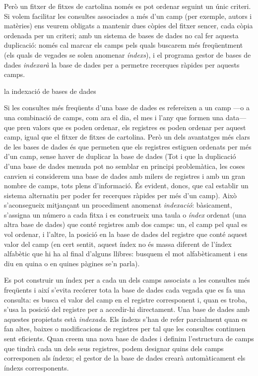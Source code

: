 Però un fitxer de fitxes de cartolina només es pot ordenar seguint un
únic criteri. Si volem facilitar les consultes associades a més d'un
camp (per exemple, autors i matèries) ens veurem obligats a mantenir
dues còpies del fitxer sencer, cada còpia ordenada per un criteri; amb
un sistema de bases de dades no cal fer aquesta duplicació: només cal
marcar els camps pels quals buscarem més freqüentment (els quals de
vegades se solen anomenar \emph{índexs}), i el programa gestor de
bases de dades \emph{indexarà} la base de dades per a permetre
recerques ràpides per aquests camps.


\begin{persabermes}{la indexació de bases de dades}

  Si les consultes més freqüents d'una base de dades es refereixen a
  un camp ---o a una combinació de camps, com ara el dia, el mes i
  l'any que formen una data--- que pren valors que es poden ordenar,
  els registres es poden ordenar per aquest camp, igual que el fitxer
  de fitxes de cartolina. Però un dels avantatges més clars de les
  bases de dades és que permeten que els registres estiguen ordenats
  per més d'un camp, sense haver de duplicar la base de dades (Tot i
  que la duplicació d'una base de dades menuda pot no semblar en
  principi problemàtica, les coses canvien si considerem una base de
  dades amb milers de registres i amb un gran nombre de camps, tots
  plens d'informació.  És evident, doncs, que cal establir un sistema
  alternatiu per poder fer recerques ràpides per més d'un camp).  Això
  s'aconsegueix mitjançant un procediment anomenat \emph{indexació}:
  bàsicament, s'assigna un número a cada fitxa i es construeix una
  taula o \emph{índex} ordenat (una altra base de dades) que conté
  registres amb dos camps: un, el camp pel qual es vol ordenar, i
  l'altre, la posició en la base de dades del registre que conté
  aquest valor del camp (en cert sentit, aquest índex no és massa
  diferent de l'índex alfabètic que hi ha al final d'alguns llibres:
  busquem el mot alfabèticament i ens diu en quina o en quines pàgines
  se'n parla).

  Es pot construir un índex per a cada un dels camps associats a les
  consultes més freqüents i així s'evita recórrer tota la base de
  dades cada vegada que es fa una consulta: es busca el valor del camp
  en el registre corresponent i, quan es troba, s'usa la posició del
  registre per a accedir-hi directament. Una base de dades amb
  aquestes propietats està \emph{indexada}.
  Els índexs s'han de refer parcialment quan es fan altes, baixes o
  modificacions de registres per tal que les consultes continuen sent
  eficients. Quan creem una nova base de dades i definim l'estructura
  de camps que tindrà cada un dels seus registres, podem designar
  quins dels camps corresponen als índexs; el gestor de la base de
  dades crearà automàticament els índexs corresponents.


\end{persabermes}
